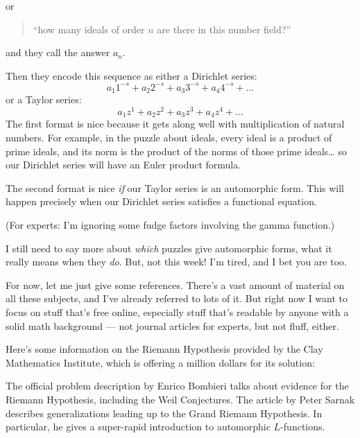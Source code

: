 \documentclass{article}
\def\tightlist{}
\renewcommand{\texttt}[1]{%
  \begingroup
  \ttfamily
  \begingroup\lccode`~=`/\lowercase{\endgroup\def~}{/\discretionary{}{}{}}%
  \begingroup\lccode`~=`[\lowercase{\endgroup\def~}{[\discretionary{}{}{}}%
  \begingroup\lccode`~=`.\lowercase{\endgroup\def~}{.\discretionary{}{}{}}%
  \catcode`/=\active\catcode`[=\active\catcode`.=\active
  \scantokens{#1\noexpand}%
  \endgroup
}
\begin{document}
or

\begin{quote}
``how many ideals of order \(n\) are there in this number field?''
\end{quote}

and they call the answer \(a_n\).

Then they encode this sequence as either a Dirichlet series:
\[a_1 1^{-s} + a_2 2^{-s} + a_3 3^{-s} + a_4 4^{-s} + \ldots\] or a
Taylor series: \[a_1 z^1 + a_2 z^2 + a_3 z^3 + a_4 z^4 + \ldots\] The
first format is nice because it gets along well with multiplication of
natural numbers. For example, in the puzzle about ideals, every ideal is
a product of prime ideals, and its norm is the product of the norms of
those prime ideals\ldots{} so our Dirichlet series will have an Euler
product formula.

The second format is nice \emph{if} our Taylor series is an automorphic
form. This will happen precisely when our Dirichlet series satisfies a
functional equation.

(For experts: I'm ignoring some fudge factors involving the gamma
function.)

I still need to say more about \emph{which} puzzles give automorphic
forms, what it really means when they \emph{do}. But, not this week! I'm
tired, and I bet you are too.

For now, let me just give some references. There's a vast amount of
material on all these subjects, and I've already referred to lots of it.
But right now I want to focus on stuff that's free online, especially
stuff that's readable by anyone with a solid math background --- not
journal articles for experts, but not fluff, either.

Here's some information on the Riemann Hypothesis provided by the Clay
Mathematics Institute, which is offering a million dollars for its
solution:


The official problem description by Enrico Bombieri talks about evidence
for the Riemann Hypothesis, including the Weil Conjectures. The article
by Peter Sarnak describes generalizations leading up to the Grand
Riemann Hypothesis. In particular, he gives a super-rapid introduction
to automorphic \(L\)-functions.
\end{document}
